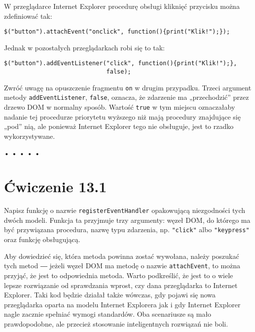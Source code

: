   
W przeglądarce Internet Explorer procedurę obsługi kliknięć przycisku można zdefiniować tak:

  
\begin{verbatim} 
$("button").attachEvent("onclick", function(){print("Klik!");});
 \end{verbatim}
  
Jednak w pozostałych przeglądarkach robi się to tak:

  
\begin{verbatim} 
$("button").addEventListener("click", function(){print("Klik!");},
                             false);
 \end{verbatim}
  
Zwróć uwagę na opuszczenie fragmentu \texttt{on} w drugim przypadku. Trzeci argument metody \texttt{addEventListener}, \texttt{false}, oznacza, że zdarzenie ma „przechodzić” przez drzewo DOM w normalny sposób. Wartość \texttt{true} w tym miejscu oznaczałaby nadanie tej procedurze priorytetu wyższego niż mają procedury znajdujące się „pod” nią, ale ponieważ Internet Explorer tego nie obsługuje, jest to rzadko wykorzystywane.



\begin{center}
• • • • •
\end{center}

  
\section*{Ćwiczenie 13.1}
\label{sec:13.1}
  
    
Napisz funkcję o nazwie \texttt{registerEventHandler} opakowującą niezgodności tych dwóch modeli. Funkcja ta przyjmuje trzy argumenty: węzeł DOM, do którego ma być przywiązana procedura, nazwę typu zdarzenia, np. \texttt{"click"} albo \texttt{"keypress"} oraz funkcję obsługującą.

    
Aby dowiedzieć się, która metoda powinna zostać wywołana, należy poszukać tych metod ― jeżeli węzeł DOM ma metodę o nazwie \texttt{attachEvent}, to można przyjąć, że jest to odpowiednia metoda. Warto podkreślić, że jest to o wiele lepsze rozwiązanie od sprawdzania wprost, czy dana przeglądarka to Internet Explorer. Taki kod będzie działał także wówczas, gdy pojawi się nowa przeglądarka oparta na modelu Internet Explorera jak i gdy Internet Explorer nagle zacznie spełniać wymogi standardów. Oba scenariusze są mało prawdopodobne, ale przecież stosowanie inteligentnych rozwiązań nie boli.

